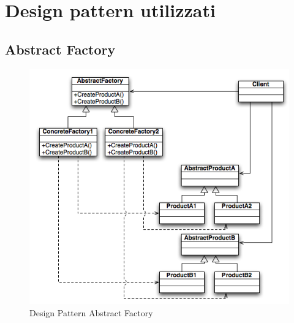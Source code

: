 \documentclass[a4paper,11pt]{article}
\begin{document}
	\section{Design pattern utilizzati}
	\subsection{Abstract Factory}
	\begin{figure}[h!]
	\begin{center}
		\includegraphics[scale=1]{../images/AbsFactory.png}
		\caption{Design Pattern Abstract Factory}
	\end{center}
	\end{figure}
\end{document}
